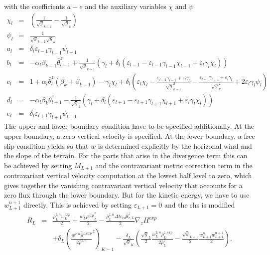 \documentclass[a4paper,10pt]{article}
\begin{document}
with the coefficients $a-e$ and the auxiliary variables $\chi$ and $\psi$
\begin{eqnarray*}
\chi_l&=&\left(\frac{1}{\sqrt{g}_{k-1}}-\frac{1}{\sqrt{g}_k}\right)\\
\psi_l&=&\frac{1}{\sqrt{g}_{k-1}\sqrt{g}_k}\\
a_l&=&\delta_l\varepsilon_{l-1}\gamma_{l-1}\psi_{l-1}\\
b_l&=&-\alpha_l\beta_{k-1}\bar{\theta}^z_{l-1}+\frac{1}{\sqrt{g}_{k-1}}\left(\gamma_l+
\delta_l\left(\varepsilon_{l-1}-\varepsilon_{l-1}\gamma_{l-1}\chi_{l-1}+\varepsilon_l\gamma_l\chi_l\right)\right)\\
c_l&=&1+\alpha_l\bar{\theta}^z_l(\beta_k+\beta_{k-1})-\gamma_l\chi_l+\delta_l\left(
\varepsilon_l\chi_l
-\frac{\varepsilon_{l-1}\gamma_{l-1}+\varepsilon_l\gamma_l}{\sqrt{g}_{k-1}^2}
-\frac{\varepsilon_{l+1}\gamma_{l+1}+\varepsilon_l\gamma_l}{\sqrt{g}_k^2}
+2\varepsilon_l\gamma_l\psi_l\right)\\
d_l&=&-\alpha_l\beta_k\bar{\theta}^z_{l+1}-\frac{1}{\sqrt{g}_k}\left(\gamma_l
+\delta_l\left(\varepsilon_{l+1}
    -\varepsilon_{l+1}\gamma_{l+1}\chi_{l+1}
    +\varepsilon_l\gamma_l\chi_l\right)\right)\\
e_l&=&\delta_l\varepsilon_{l+1}\gamma_{l+1}\psi_{l+1}
\end{eqnarray*}
The upper and lower boundary condition have to be specified additionally. At the upper boundary, a zero vertical velocity is specified. At the lower boundary, a free slip condition yields so that $w$ is determined explicitly by the horizonal wind and the slope of the terrain. For the parts that arise in the divergence term this can be achieved by setting $M_{L+1}$ and the contravariant metric correction term in the contravariant vertical velocity computation at the lowest half level to zero, which gives together the vanishing contravariant vertical velocity that accounts for a zero flux through the lower boundary. But for the kinetic energy, we have to use $w_{L+1}^{n+1}$ directly. This is achieved by setting $\varepsilon_{L+1}=0$ and the rhs is modified 
\begin{eqnarray*}
 R_L&=&\frac{\bar{\rho}^{z,n}_Lw^{exp}_L}{2}+\frac{w^n_L\overline{\rho^{exp}}^z_L}{2}
-\frac{\bar{\rho}^{z,n}_L\Delta t c_{vd}\bar\theta^z_{v,L}}{2}\nabla_z \Pi^{exp}\\
&&+\delta_L \left(\overline{\frac{w^{2,n}\bar\rho^{z,exp}}{2\bar\rho^{z,n}}}^z\right)_{K-1}
-\frac{\delta_L}{\sqrt{g}_K}\left(\frac{\sqrt{g}_L}{2}\frac{w_L^{2,n}\bar{\rho}^{z,exp}_L}{2\bar{\rho}^z_L}
-\frac{\sqrt{g}_{L+1}}{2}\frac{w_{L+1}^nw_{L+1}^{n+1}}{2}\right).
\end{eqnarray*}
\end{document}
